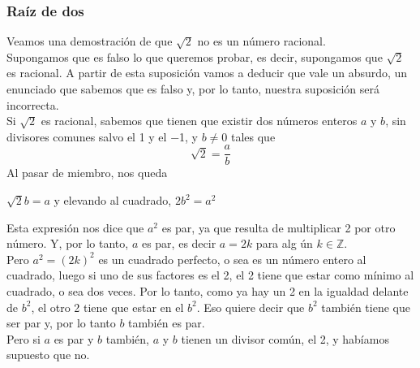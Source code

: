 \documentclass[Análisis.root.tex]{subfiles}
\newcommand{\Z}{\mathbb{Z}}
\begin{document}
        \subsubsection{Raíz de dos}
        Veamos una demostración de que \(\sqrt{2}\) no es un número racional.\\
        Supongamos que es falso lo que queremos probar, es decir, supongamos que \(\sqrt{2}\) es racional. A partir de esta suposición vamos a deducir que vale un absurdo, un enunciado que sabemos que es falso y, por lo tanto, nuestra suposición será incorrecta.\\
        Si \(\sqrt{2}\) es racional, sabemos que tienen que existir dos números enteros \(a\) y \(b\), sin divisores comunes salvo el 1 y el −1, y \(b \neq 0\) tales que \[\sqrt{2}=\frac{a}{b}\] Al pasar de miembro, nos queda
        \begin{center}
            \(\sqrt{2}b=a\) y elevando al cuadrado, \(2b^2=a^2\)
        \end{center}
        Esta expresión nos dice que \(a^2\) es par, ya que resulta de multiplicar 2 por otro número. Y, por lo tanto, \(a\) es par, es decir \(a = 2k\) para alg ún \(k \in \Z\).\\
        Pero \(a^2 = (2k)^2\) es un cuadrado perfecto, o sea es un número entero al cuadrado, luego si uno de sus factores es el 2, el 2 tiene que estar como mínimo al cuadrado, o sea dos veces. Por lo tanto, como ya hay un 2 en la igualdad delante de \(b^2\), el otro 2 tiene que estar en el \(b^2\). Eso quiere decir que \(b^2\) también tiene que ser par y, por lo tanto \(b\) también es par.\\
        Pero si \(a\) es par y \(b\) también, \(a\) y \(b\) tienen un divisor común, el 2, y habíamos supuesto que no.
\end{document}
